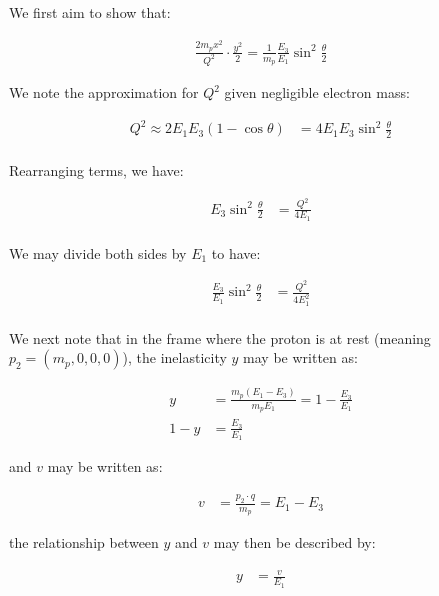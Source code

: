 \documentclass[11pt]{article}
\theoremstyle{definition}
\begin{document}
We first aim to show that:

\begin{align}\label{prove b1}
    \frac{2m_px^2}{Q^2}\cdot \frac{y^2}{2} = \frac{1}{m_p}\frac{E_3}{E_1}\sin^2\frac{\theta}{2}
\end{align}

We note the approximation for $Q^2$ given negligible electron mass:

\begin{align}
    Q^2 \approx 2E_1E_3(1-\cos\theta) &= 4E_1E_3\sin^2\frac{\theta}{2}\\
\end{align}

Rearranging terms, we have:

\begin{align}
    E_3\sin^2\frac{\theta}{2} &= \frac{Q^2}{4E_1}\\
\end{align}

We may divide both sides by $E_1$ to have:

\begin{align}\label{eq 1}
    \frac{E_3}{E_1}\sin^2\frac{\theta}{2} &= \frac{Q^2}{4E_1^2}\\
\end{align}

We next note that in the frame where the proton is at rest (meaning $p_2 = (m_p,0,0,0)$), the inelasticity $y$ may be written as:

\begin{align}
    y &= \frac{m_p(E_1-E_3)}{m_pE_1} = 1-\frac{E_3}{E_1}\\
    1-y &= \frac{E_3}{E_1}
\end{align}

and $v$ may be written as:

\begin{align}
    v &= \frac{p_2 \cdot q}{m_p} = E_1-E_3
\end{align}

the relationship between $y$ and $v$ may then be described by:

\begin{align}
    y &= \frac{v}{E_1}
\end{align}


\end{document}
